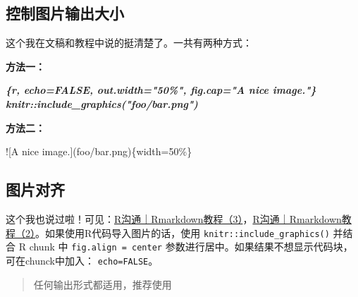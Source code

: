 \documentclass[
]{book}
\newenvironment{Shaded}{\begin{snugshade}}{\end{snugshade}}
\newcommand{\AlertTok}[1]{\textcolor[rgb]{0.94,0.16,0.16}{#1}}
\newcommand{\InformationTok}[1]{\textcolor[rgb]{0.56,0.35,0.01}{\textbf{\textit{#1}}}}
\newcommand{\NormalTok}[1]{#1}
\begin{document}
\hypertarget{ux63a7ux5236ux56feux7247ux8f93ux51faux5927ux5c0f}{%
\subsection{控制图片输出大小}\label{ux63a7ux5236ux56feux7247ux8f93ux51faux5927ux5c0f}}

这个我在文稿和教程中说的挺清楚了。一共有两种方式：

\textbf{方法一：}

\begin{Shaded}
\begin{Highlighting}[]
\InformationTok{\textasciigrave{}\textasciigrave{}\textasciigrave{}\{r, echo=FALSE, out.width="50\%", fig.cap="A nice image."\}}
\InformationTok{knitr::include\_graphics("foo/bar.png")}
\InformationTok{\textasciigrave{}\textasciigrave{}\textasciigrave{}}
\end{Highlighting}
\end{Shaded}

\textbf{方法二：}

\begin{Shaded}
\begin{Highlighting}[]
\AlertTok{![A nice image.](foo/bar.png)}\NormalTok{\{width=50\%\}}
\end{Highlighting}
\end{Shaded}

\hypertarget{ux56feux7247ux5bf9ux9f50}{%
\subsection{图片对齐}\label{ux56feux7247ux5bf9ux9f50}}

这个我也说过啦！可见：\href{http://mp.weixin.qq.com/s?__biz=MzI1NjUwMjQxMQ==\&mid=2247491844\&idx=1\&sn=36decacb06ca6ce1fc689141174bb98f\&chksm=ea271ee0dd5097f615b87c27151200635a9e5ff3c3072864bcf8fe6e8fbc41c0cffc6c95148f\&scene=21\#wechat_redirect}{R沟通｜Rmarkdown教程（3）}，\href{http://mp.weixin.qq.com/s?__biz=MzI1NjUwMjQxMQ==\&mid=2247491546\&idx=1\&sn=00f8dea8903dbf4ec6e683ab5061a7a5\&chksm=ea24e03edd536928ff6c5a3600c8fbbd87cafbf9286ad47bfe4c084032cada9bf6ee7dfddcd9\&scene=21\#wechat_redirect}{R沟通｜Rmarkdown教程（2）}。如果使用R代码导入图片的话，使用
\texttt{knitr::include\_graphics()} 并结合 R chunk 中 \texttt{fig.align\ =\ \textquotesingle{}center\textquotesingle{}}
参数进行居中。如果结果不想显示代码块，可在chunck中加入： \texttt{echo=FALSE}。

\begin{quote}
任何输出形式都适用，推荐使用
\end{quote}
\end{document}

